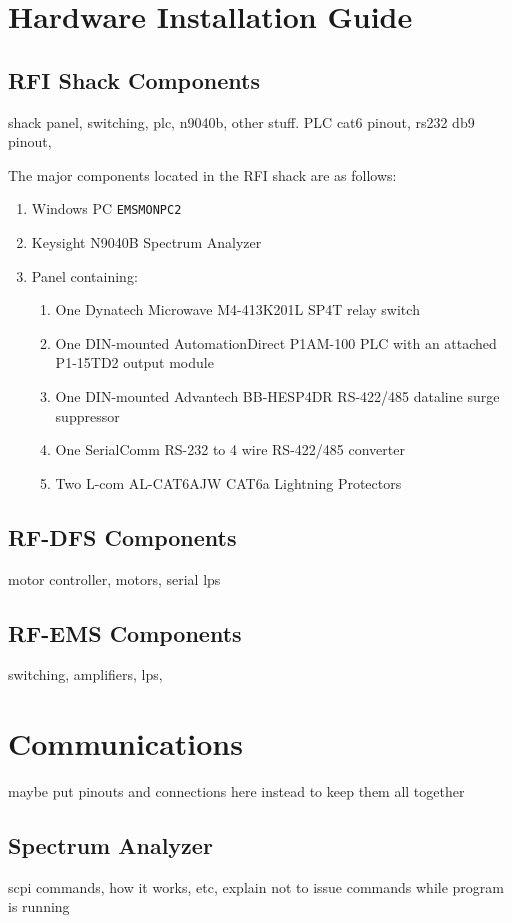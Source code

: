 \documentclass[titlepage]{article}
\begin{document}
\section{Hardware Installation Guide}\label{sec:hig}
\subsection{RFI Shack Components}
shack panel, switching, plc, n9040b, other stuff. PLC cat6 pinout, rs232 db9 pinout,

The major components located in the RFI shack are as follows:
\begin{enumerate}
  \item Windows PC \verb|EMSMONPC2|
  \item Keysight N9040B Spectrum Analyzer
  \item Panel containing:
  \begin{enumerate}
    \item One Dynatech Microwave M4-413K201L SP4T relay switch
    \item One DIN-mounted AutomationDirect P1AM-100 PLC with an attached P1-15TD2 output module
    \item One DIN-mounted Advantech BB-HESP4DR RS-422/485 dataline surge suppressor
    \item One SerialComm RS-232 to 4 wire RS-422/485 converter
    \item Two L-com AL-CAT6AJW CAT6a Lightning Protectors
  \end{enumerate}
\end{enumerate}

\subsection{RF-DFS Components}
motor controller, motors, serial lps
\subsection{RF-EMS Components}
switching, amplifiers, lps,

\section{Communications}
maybe put pinouts and connections here instead to keep them all together
\subsection{Spectrum Analyzer}
scpi commands, how it works, etc, explain not to issue commands while program is running
\end{document}

